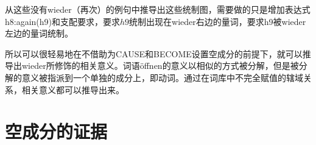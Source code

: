 从这些没有wieder（再次）的例句中推导出这些统制图，需要做的只是增加表达式h8:again(h9)和支配要求，要求$h9$统制出现在wieder右边的量词，要求h9被wieder左边的量词统制。

所以可以很轻易地在不借助为CAUSE和BECOME设置空成分的前提下，就可以推导出wieder所修饰的相关意义。词语öffnen的意义以相似的方式被分解，但是被分解的意义被指派到一个单独的成分上，即动词。通过在词库中不完全赋值的辖域关系，相关意义都可以推导出来。



\section{空成分的证据}
\label{Abschnitt-Evidenz-leere-Elemente}

